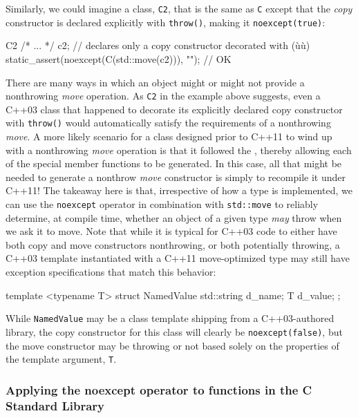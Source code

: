 \noindent Similarly, we could imagine a class, \lstinline!C2!, that is the same as
\lstinline!C! except that the \emph{copy} constructor is declared
explicitly with \lstinline!throw()!, making it \lstinline!noexcept(true)!:

\begin{emcppslisting}
C2 {/* ... */} c2;  // declares only a copy constructor decorated with (ù{}ù)
static_assert(noexcept(C(std::move(c2))), "");    // OK
\end{emcppslisting}
    

\noindent There are many ways in which an object might or might not provide a
nonthrowing \emph{move} operation. As \lstinline!C2! in the example above
suggests, even a C++03 class that happened to decorate its explicitly
declared copy constructor with \lstinline!throw()! would automatically
satisfy the requirements of a nonthrowing \emph{move}. A more likely
scenario for a class designed prior to C++11 to wind up with a
nonthrowing \emph{move} operation is that it followed the , thereby allowing each of the special member functions to be
generated. In this case, all that might be needed to generate a nonthrow
\emph{move} constructor is simply to recompile it under C++11! The
takeaway here is that, irrespective of how a type is implemented, we can
use the \lstinline!noexcept! operator in combination with
\lstinline!std::move! to reliably determine, at compile time, whether an
object of a given type \emph{may} throw when we ask it to move. Note
that while it is typical for C++03 code to either have both copy and
move constructors nonthrowing, or both potentially throwing, a C++03
template instantiated with a C++11 move-optimized type may still have
exception specifications that match this behavior:

\begin{emcppslisting}
template <typename T>
struct NamedValue
{
    std::string d_name;
    T           d_value;
};
\end{emcppslisting}
    

\noindent While \lstinline!NamedValue! may be a class template shipping from a
C++03-authored library, the copy constructor for this class will clearly
be \lstinline!noexcept(false)!, but the move constructor may be throwing or
not based solely on the properties of the template argument, \lstinline!T!.

\subsubsection[Applying the \lstinline!noexcept! operator to functions in the C Standard Library]{Applying the {\SubsubsecCode noexcept} operator to functions in the C Standard Library}\label{applying-the-noexcept-operator-to-functions-in-the-c-standard-library}

